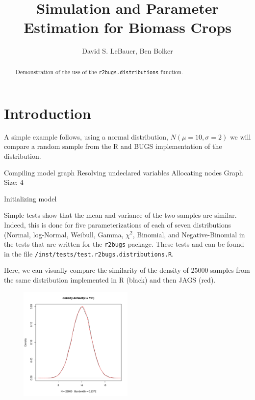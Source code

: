 \documentclass[12pt]{article}
\title{Simulation and Parameter Estimation for Biomass Crops}
\author{David S. LeBauer, Ben Bolker}
\begin{document}



\newcommand{\code}[1]{\texttt{\small{#1}}}

\maketitle
\begin{abstract}
Demonstration of the use of the \code{r2bugs.distributions} function.
\end{abstract}


\section{Introduction}

A simple example follows, using a normal distribution, $N(\mu = 10, \sigma = 2)$ we will compare a random sample from the R and BUGS implementation of the distribution.

\begin{Schunk}
\begin{Soutput}
Compiling model graph
   Resolving undeclared variables
   Allocating nodes
   Graph Size: 4

Initializing model
\end{Soutput}
\end{Schunk}


Simple tests show that the mean and variance of the two samples are similar. Indeed, this is done for five parameterizations of each of seven distributions (Normal, log-Normal, Weibull, Gamma, $\chi^2$, Binomial, and Negative-Binomial in the tests that are written for the \code{r2bugs} package. These tests and can be found in the file \code{/inst/tests/test.r2bugs.distributions.R}.

Here, we can visually compare the similarity of the density of 25000 samples from the same distribution implemented in R (black) and then JAGS (red).

\begin{figure}[htbp!]
  \centering
  \includegraphics[width=0.5\textwidth]{fig1}
\end{figure}
\end{document}
